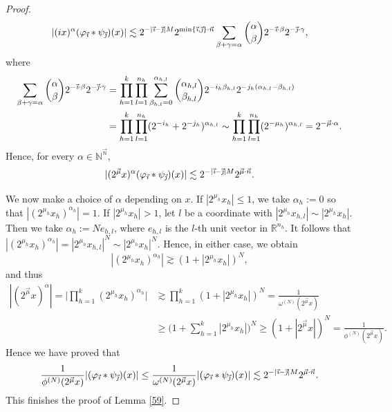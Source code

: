 \documentclass[11pt, reqno]{amsart}
\theoremstyle{definition}
\theoremstyle{remark}
\numberwithin{equation}{section}
\newcommand{\N}{\mathbb N}
\newcommand{\R}{\mathbb R}
\newcommand{\vi}{\vec{\textit{\i}}}
\newcommand{\vj}{\vec{\textit{\j}}}
\newcommand{\vmu}{\vec\mu}
\newcommand{\vn}{\vec n}
\newcommand{\abs}[1]{|#1|}
\begin{document}
\begin{proof}
\begin{equation*}
\abs{(ix)^\alpha(\varphi_{\vi}*\psi_{\vj})(x)}
\lesssim 2^{-\abs{\vi-\vj}M}2^{\min\{\vi,\vj\}\cdot\vn}\sum_{\beta+\gamma=\alpha}
\binom{\alpha}{\beta}2^{-\vi\cdot\beta}2^{-\vj\cdot\gamma},
\end{equation*}
where
\begin{equation*}
\begin{split}
\sum_{\beta+\gamma=\alpha}\binom{\alpha}{\beta}2^{-\vi\cdot\beta}2^{-\vj\cdot\gamma}
&=\prod_{h=1}^k\prod_{l=1}^{n_h}\sum_{\beta_{h,l}=0}^{\alpha_{h,l}}
\binom{\alpha_{h,l}}{\beta_{h,l}}2^{-i_h\beta_{h,l}}2^{-j_h(\alpha_{h,l}-\beta_{h,l})} \\
&=\prod_{h=1}^k\prod_{l=1}^{n_h}(2^{-i_{h}}+2^{-j_{h}})^{\alpha_{h,l}}
\sim\prod_{h=1}^k\prod_{l=1}^{n_h}(2^{-\mu_{h}})^{\alpha_{h,l}}
=2^{-\vmu\cdot\alpha}.
\end{split}
\end{equation*}
Hence, for every $\alpha\in\N^{\vn}$,
\begin{equation*}
\abs{(2^{\vmu}x)^\alpha(\varphi_{\vi}*\psi_{\vj})(x)}
\lesssim 2^{-\abs{\vi-\vj}M}2^{\vmu\cdot\vn}.
\end{equation*}

We now make a choice of $\alpha$ depending on $x$. If $\abs{2^{\mu_h}x_h}\leq 1$, we take $\alpha_h:=0$ so that $\abs{(2^{\mu_h}x_h)^{\alpha_h}}=1$. If $\abs{2^{\mu_h}x_h}>1$, let $l$ be a coordinate with $\abs{2^{\mu_h}x_{h,l}}\sim\abs{2^{\mu_h}x_h}$. Then we take $\alpha_h:=Ne_{h,l}$, where $e_{h,l}$ is the $l$-th unit vector in $\R^{n_h}$. It follows that $\abs{(2^{\mu_h}x_h)^{\alpha_h}}=\abs{2^{\mu_h}x_{h,l}}^N\sim \abs{2^{\mu_h}x_h}^N$. Hence, in either case, we obtain
\begin{equation*}
\abs{(2^{\mu_h}x_h)^{\alpha_h}}\gtrsim(1+\abs{2^{\mu_h}x_h})^N,
\end{equation*}
and thus
\begin{equation*}
\begin{split}
\abs{(2^{\vmu}x)^{\alpha}}
=\Bigg|\prod_{h=1}^k(2^{\mu_h}x_h)^{\alpha_h}\Bigg|
&\gtrsim\prod_{h=1}^k (1+\abs{2^{\mu_h}x_h})^N=\frac{1}{\omega^{(N)}(2^{\vmu}x)} \\
&\geq\Bigg(1+\sum_{h=1}^k\abs{2^{\mu_h}x_h}\Bigg)^N
\geq(1+\abs{2^{\vmu}x})^N=\frac{1}{\phi^{(N)}(2^{\vmu}x)}.
\end{split}
\end{equation*}
Hence we have proved that
\begin{equation*}
\frac{1}{\phi^{(N)}(2^{\vmu}x)}\abs{(\varphi_{\vi}*\psi_{\vj})(x)}
\leq\frac{1}{\omega^{(N)}(2^{\vmu}x)}\abs{(\varphi_{\vi}*\psi_{\vj})(x)}
\lesssim 2^{-\abs{\vi-\vj}M}2^{\vmu\cdot\vn}.
\end{equation*}
This finishes the proof of Lemma \ref{59}.
\end{proof}
\end{document}
